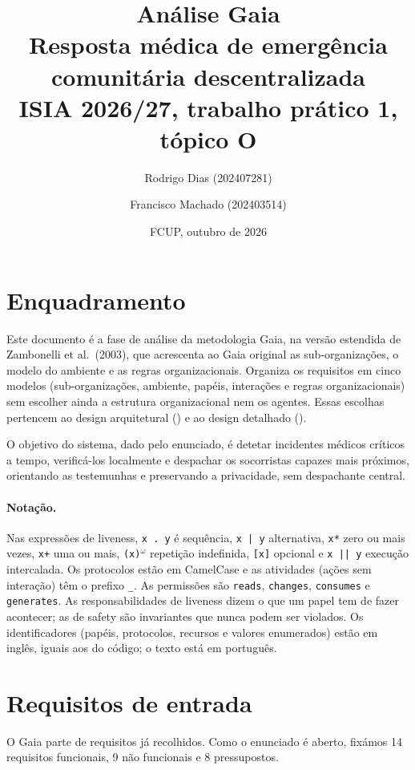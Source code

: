 \documentclass[10pt,a4paper]{article}
\title{Análise Gaia\\[0.4em]\large Resposta médica de emergência comunitária descentralizada\\ISIA 2026/27, trabalho prático 1, tópico O}
\author{Rodrigo Dias (202407281) \and Francisco Machado (202403514)}
\date{FCUP, outubro de 2026}
\newcommand{\om}{$^{\omega}$}
\newcommand{\id}[1]{\texttt{#1}}
\begin{document}
\maketitle

\section{Enquadramento}\label{sec:enquadramento}

Este documento é a fase de análise da metodologia Gaia, na versão estendida de Zambonelli et al.\ (2003), que acrescenta ao Gaia original as sub-organizações, o modelo do ambiente e as regras organizacionais. Organiza os requisitos em cinco modelos (sub-organizações, ambiente, papéis, interações e regras organizacionais) sem escolher ainda a estrutura organizacional nem os agentes. Essas escolhas pertencem ao design arquitetural () e ao design detalhado ().

O objetivo do sistema, dado pelo enunciado, é detetar incidentes médicos críticos a tempo, verificá-los localmente e despachar os socorristas capazes mais próximos, orientando as testemunhas e preservando a privacidade, sem despachante central.

\paragraph{Notação.} Nas expressões de liveness, \id{x . y} é sequência, \id{x | y} alternativa, \id{x*} zero ou mais vezes, \id{x+} uma ou mais, \id{(x)}\om{} repetição indefinida, \id{[x]} opcional e \id{x || y} execução intercalada. Os protocolos estão em CamelCase e as atividades (ações sem interação) têm o prefixo \id{\_}. As permissões são \id{reads}, \id{changes}, \id{consumes} e \id{generates}. As responsabilidades de liveness dizem o que um papel tem de fazer acontecer; as de safety são invariantes que nunca podem ser violados. Os identificadores (papéis, protocolos, recursos e valores enumerados) estão em inglês, iguais aos do código; o texto está em português.

\section{Requisitos de entrada}\label{sec:requisitos}

O Gaia parte de requisitos já recolhidos. Como o enunciado é aberto, fixámos 14 requisitos funcionais, 9 não funcionais e 8 pressupostos.
\end{document}

